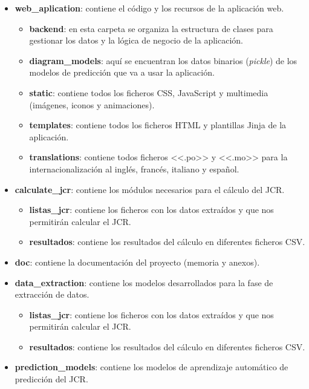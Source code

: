 \begin{itemize}
    \item \textbf{web\_aplication}: contiene el código y los recursos de la aplicación web.
    \begin{itemize}
        \item \textbf{backend}: en esta carpeta se organiza la estructura de clases para gestionar los datos y la lógica de negocio de la aplicación.
        \item \textbf{diagram\_models}: aquí se encuentran los datos binarios (\textit{pickle}) de los modelos de predicción que va a usar la aplicación.
        \item \textbf{static}: contiene todos los ficheros CSS, JavaScript y multimedia (imágenes, iconos y animaciones).
        \item \textbf{templates}: contiene todos los ficheros HTML y plantillas Jinja de la aplicación.
        \item \textbf{translations}: contiene todos ficheros <<.po>> y <<.mo>> para la internacionalización al inglés, francés, italiano y español.
        
    \end{itemize}
        
    \item \textbf{calculate\_jcr}: contiene los módulos necesarios para el cálculo del JCR.
    \begin{itemize}
        \item \textbf{listas\_jcr}: contiene los ficheros con los datos extraídos y que nos permitirán calcular el JCR.
        \item \textbf{resultados}: contiene los resultados del cálculo en diferentes ficheros CSV.    
    \end{itemize}
    
    \item \textbf{doc}: contiene la documentación del proyecto (memoria y anexos).
        
    \item \textbf{data\_extraction}: contiene los modelos desarrollados para la fase de extracción de datos.
    \begin{itemize}
        \item \textbf{listas\_jcr}: contiene los ficheros con los datos extraídos y que nos permitirán calcular el JCR.
        \item \textbf{resultados}: contiene los resultados del cálculo en diferentes ficheros CSV.    
    \end{itemize}

    \item \textbf{prediction\_models}: contiene los modelos de aprendizaje automático de predicción del JCR.
\end{itemize}

